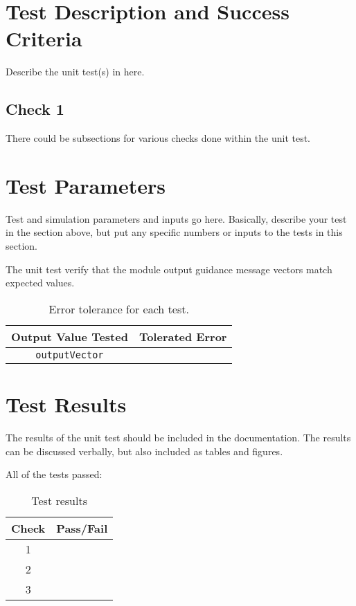 
\section{Test Description and Success Criteria}
Describe the unit test(s) in here.

\subsection{Check 1}
There could be subsections for various checks done within the unit test.





\section{Test Parameters}

Test and simulation parameters and inputs go here. Basically, describe your test in the section above, but put any specific numbers or inputs to the tests in this section.

The unit test verify that the module output guidance message vectors match expected values.
\begin{table}[htbp]
	\caption{Error tolerance for each test.}
	\label{tab:errortol}
	\centering \fontsize{10}{10}\selectfont
	\begin{tabular}{ c | c } %
		\hline\hline
		\textbf{Output Value Tested}  & \textbf{Tolerated Error}  \\ 
		\hline
		{\tt outputVector}        & 	   \\ 
		\hline\hline
	\end{tabular}
\end{table}




\section{Test Results}
The results of the unit test should be included in the documentation.  The results can be discussed verbally, but also included as tables and figures.  

All of the tests passed:
\begin{table}[H]
	\caption{Test results}
	\label{tab:results}
	\centering \fontsize{10}{10}\selectfont
	\begin{tabular}{c | c  } %
		\hline\hline
		\textbf{Check} 						  		&\textbf{Pass/Fail} \\ 
		\hline
	   1	   			&  \\ 
	   2	   			&  \\ 
	   3	   			&  \\ 
	   \hline\hline
	\end{tabular}
\end{table}



